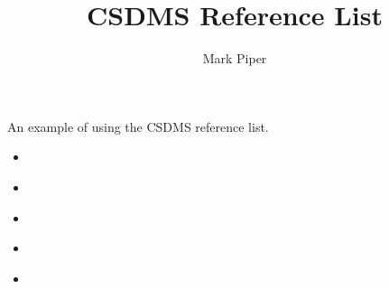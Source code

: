 \documentclass[11pt]{article}
\begin{document}
\title{CSDMS Reference List}
\author{Mark Piper}
\maketitle

An example of using the CSDMS reference list.

\begin{itemize}
\item \cite{tucker:2010}
\item \cite{overeem:2015a}
\item \cite{kettner:2008}
\item \cite{hutton:2008}
\item \cite{piper:2015}
\end{itemize}


\end{document}
